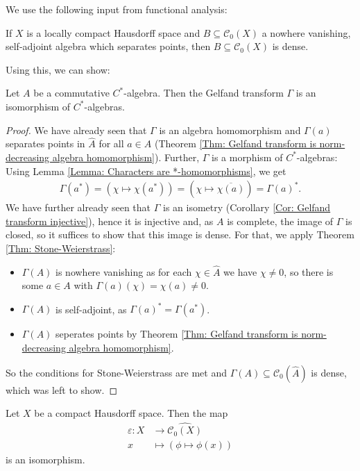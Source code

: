\documentclass[american]{scrartcl}
\newcommand{\cC}{\mathcal{C}}
\newcommand{\eps}{\varepsilon}
\newcommand{\conj}[1]{\overline{#1}}
\begin{document}
We use the following input from functional analysis:
\begin{theorem}\label{Thm: Stone-Weierstrass}
	If $X$ is a locally compact Hausdorff space and $B\subseteq\cC_0(X)$ a nowhere vanishing, self-adjoint algebra which separates points, then $B\subseteq\cC_0(X)$ is dense.
\end{theorem}
Using this, we can show:
\begin{theorem}
	Let $A$ be a commutative $C^*$-algebra. Then the Gelfand transform $\Gamma$ is an isomorphism of $C^*$-algebras.
\end{theorem}
\begin{proof}
	We have already seen that $\Gamma$ is an algebra homomorphism and $\Gamma(a)$ separates points in $\hat{A}$ for all $a\in A$ (Theorem \ref{Thm: Gelfand transform is norm-decreasing algebra homomorphism}). Further, $\Gamma$ is a morphism of $C^*$-algebras: 
	Using Lemma \ref{Lemma: Characters are *-homomorphisms}, we get
	\begin{align*}
		\Gamma(a^*)=(\chi\mapsto\chi(a^*))=(\chi\mapsto \conj{\chi(a)})=\Gamma(a)^*.
	\end{align*}
	We have further already seen that $\Gamma$ is an isometry (Corollary \ref{Cor: Gelfand transform injective}), hence it is injective and, as $A$ is complete, the image of $\Gamma$ is closed, so it suffices to show that this image is dense. For that, we apply Theorem \ref{Thm: Stone-Weierstrass}:
	\begin{itemize}
		\item $\Gamma(A)$ is nowhere vanishing as for each $\chi\in \hat{A}$ we have $\chi\neq 0$, so there is some $a\in A$ with $\Gamma(a)(\chi)=\chi(a)\neq 0$.
		\item $\Gamma(A)$ is self-adjoint, as $\Gamma(a)^*=\Gamma(a^*)$.
		\item $\Gamma(A)$ seperates points by Theorem \ref{Thm: Gelfand transform is norm-decreasing algebra homomorphism}.
	\end{itemize}
	So the conditions for Stone-Weierstrass are met and $\Gamma(A)\subseteq \cC_0(\hat{A})$ is dense, which was left to show.
\end{proof}
\begin{proposition}\label{Prop: Spectrum of algebra of continuous functions on X is X}
	Let $X$ be a compact Hausdorff space. Then the map
	\begin{align*}
		\eps: X&\to \widehat{\cC_0(X)}\\
		x&\mapsto (\phi\mapsto \phi(x))
	\end{align*}
	is an isomorphism.
\end{proposition}
\end{document}
